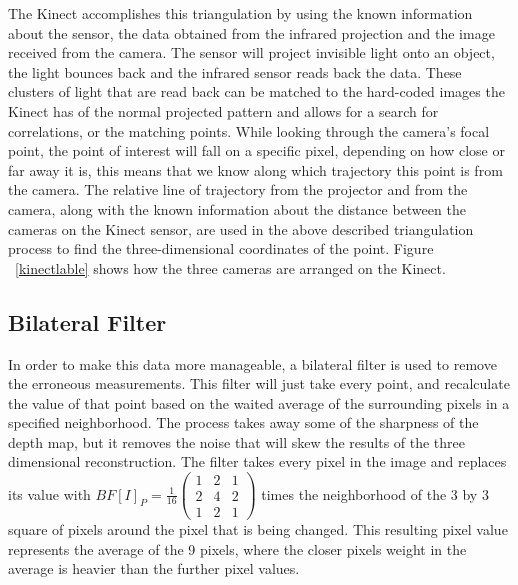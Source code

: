 \documentclass[pdftex,10.5pt]{report}
\begin{document}
The Kinect accomplishes this triangulation by using the known information about the sensor, the data obtained from the infrared projection and the image received from the camera. The sensor will project invisible light onto an object, the light bounces back and the infrared sensor reads back the data. These clusters of light that are read back can be matched to the hard-coded images the Kinect has of the normal projected pattern and allows for a search for correlations, or the matching points. While looking through the camera's focal point, the point of interest will fall on a specific pixel, depending on how close or far away it is, this means that we know along which trajectory this point is from the camera. The relative line of trajectory from the projector and from the camera, along with the known information about the distance between the cameras on the Kinect sensor, are used in the above described triangulation process to find the three-dimensional coordinates of the point. Figure ~\ref{kinectlable} shows how the three cameras are arranged on the Kinect.

\subsection{Bilateral Filter}
In order to make this data more manageable, a bilateral filter is used to remove the erroneous measurements. This filter will just take every point, and recalculate the value of that point based on the waited average of the surrounding pixels in a specified neighborhood. The process takes away some of the sharpness of the depth map, but it removes the noise that will skew the results of the three dimensional reconstruction. The filter takes every pixel in the image and replaces its value with $BF[I]_{P} = \frac{1}{16} \left( \begin{array}{ccc}
1 & 2 & 1 \\
2 & 4 & 2 \\
1 & 2 & 1 \end{array}  \right) $ times the neighborhood of the 3 by 3 square of pixels around the pixel that is being changed. This resulting pixel value represents the average of the 9 pixels, where the closer pixels weight in the average is heavier than the further pixel values.  
\end{document}
